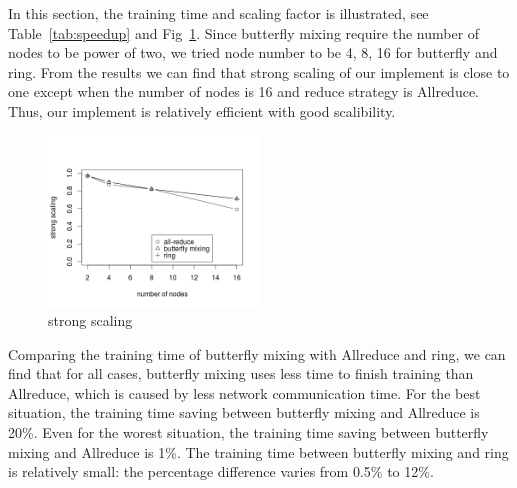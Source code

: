 \documentclass{article}
\begin{document}
In this section, the training time and scaling factor is illustrated, see Table~\ref{tab:speedup} and Fig~\ref{fig:strongS}. Since butterfly mixing require the number of nodes to be power of two, we tried node number to be 4, 8, 16 for butterfly and ring. From the results we can find that strong scaling of our implement is close to one except when the number of nodes is 16 and reduce strategy is Allreduce. Thus, our implement is relatively efficient with good scalibility. \\
\begin{figure}[htb]
  \centering
  \includegraphics[width=0.5\textwidth]{strongS.jpeg}
  \caption{strong scaling}
  \label{fig:strongS}
\end{figure}
Comparing the training time of butterfly mixing with Allreduce and ring, we can find that for all cases, butterfly mixing uses less time to finish training than Allreduce, which is caused by less network communication time. For the best situation, the training time saving between butterfly mixing and Allreduce is 20\%. Even for the worest situation, the training time saving between butterfly mixing and Allreduce is 1\%. The training time between butterfly mixing and ring is relatively small: the percentage difference varies from 0.5\% to 12\%. 
\end{document}
